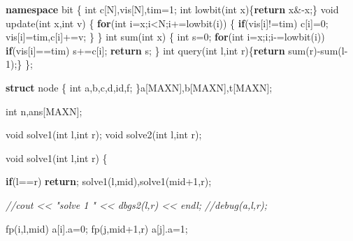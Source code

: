 \documentclass[
]{article}
\newenvironment{Shaded}{}{}
\newcommand{\CommentTok}[1]{\textcolor[rgb]{0.38,0.63,0.69}{\textit{#1}}}
\newcommand{\ControlFlowTok}[1]{\textcolor[rgb]{0.00,0.44,0.13}{\textbf{#1}}}
\newcommand{\DataTypeTok}[1]{\textcolor[rgb]{0.56,0.13,0.00}{#1}}
\newcommand{\DecValTok}[1]{\textcolor[rgb]{0.25,0.63,0.44}{#1}}
\newcommand{\KeywordTok}[1]{\textcolor[rgb]{0.00,0.44,0.13}{\textbf{#1}}}
\newcommand{\NormalTok}[1]{#1}
\begin{document}
\begin{Shaded}
\begin{Highlighting}[]
\KeywordTok{namespace}\NormalTok{ bit}
\NormalTok{\{}
    \DataTypeTok{int}\NormalTok{ c[N],vis[N],tim=}\DecValTok{1}\NormalTok{;}
    \DataTypeTok{int}\NormalTok{ lowbit(}\DataTypeTok{int}\NormalTok{ x)\{}\ControlFlowTok{return}\NormalTok{ x\&{-}x;\}}
    \DataTypeTok{void}\NormalTok{ update(}\DataTypeTok{int}\NormalTok{ x,}\DataTypeTok{int}\NormalTok{ v)}
\NormalTok{    \{}
        \ControlFlowTok{for}\NormalTok{(}\DataTypeTok{int}\NormalTok{ i=x;i\textless{}N;i+=lowbit(i))}
\NormalTok{        \{}
            \ControlFlowTok{if}\NormalTok{(vis[i]!=tim) c[i]=}\DecValTok{0}\NormalTok{;}
\NormalTok{            vis[i]=tim,c[i]+=v;}
\NormalTok{        \}}
\NormalTok{    \}}
    \DataTypeTok{int}\NormalTok{ sum(}\DataTypeTok{int}\NormalTok{ x)}
\NormalTok{    \{}
        \DataTypeTok{int}\NormalTok{ s=}\DecValTok{0}\NormalTok{;}
        \ControlFlowTok{for}\NormalTok{(}\DataTypeTok{int}\NormalTok{ i=x;i;i{-}=lowbit(i))}
            \ControlFlowTok{if}\NormalTok{(vis[i]==tim)}
\NormalTok{                s+=c[i];}
        \ControlFlowTok{return}\NormalTok{ s;}
\NormalTok{    \}}
    \DataTypeTok{int}\NormalTok{ query(}\DataTypeTok{int}\NormalTok{ l,}\DataTypeTok{int}\NormalTok{ r)\{}\ControlFlowTok{return}\NormalTok{ sum(r){-}sum(l{-}}\DecValTok{1}\NormalTok{);\}}
\NormalTok{\};}

\KeywordTok{struct}\NormalTok{ node}
\NormalTok{\{}
    \DataTypeTok{int}\NormalTok{ a,b,c,d,id,f;}
\NormalTok{\}a[MAXN],b[MAXN],t[MAXN];}

\DataTypeTok{int}\NormalTok{ n,ans[MAXN];}

\DataTypeTok{void}\NormalTok{ solve1(}\DataTypeTok{int}\NormalTok{ l,}\DataTypeTok{int}\NormalTok{ r);}
\DataTypeTok{void}\NormalTok{ solve2(}\DataTypeTok{int}\NormalTok{ l,}\DataTypeTok{int}\NormalTok{ r);}

\DataTypeTok{void}\NormalTok{ solve1(}\DataTypeTok{int}\NormalTok{ l,}\DataTypeTok{int}\NormalTok{ r)}
\NormalTok{\{}

    \ControlFlowTok{if}\NormalTok{(l==r) }\ControlFlowTok{return}\NormalTok{;}
\NormalTok{    solve1(l,mid),solve1(mid+}\DecValTok{1}\NormalTok{,r);}

    \CommentTok{//cout \textless{}\textless{} "solve 1 " \textless{}\textless{} dbgs2(l,r) \textless{}\textless{} endl;}
    \CommentTok{//debug(a,l,r);}

\NormalTok{    fp(i,l,mid)   a[i].a=}\DecValTok{0}\NormalTok{;}
\NormalTok{    fp(j,mid+}\DecValTok{1}\NormalTok{,r) a[j].a=}\DecValTok{1}\NormalTok{;}


\end{Highlighting}
\end{Shaded}
\end{document}
